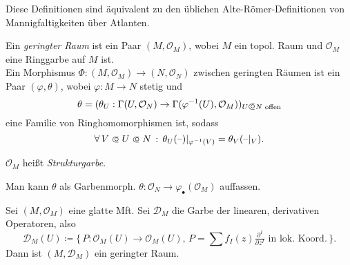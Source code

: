 \documentclass{cheat-sheet}
\renewcommand{\O}{\mathcal{O}} %
\begin{document}
\begin{bem}
  Diese Definitionen sind äquivalent zu den üblichen Alte-Römer-Definitionen von Mannigfaltigkeiten über Atlanten.
\end{bem}

\begin{defn}
  Ein \emph{geringter Raum} ist ein Paar $(M, \O_M)$, wobei $M$ ein topol. Raum und $\O_M$ eine Ringgarbe auf $M$ ist. \\
  Ein Morphismus $\Phi : (M, \O_M) \to (N, \O_N)$ zwischen geringten Räumen ist ein Paar $(\varphi, \theta)$, wobei $\varphi : M \to N$ stetig und
  \[ \theta = (\theta_U : \Gamma(U, \O_N) \to \Gamma(\varphi^{-1}(U), \O_M))_{U \opn N \text{ offen}} \]
  eine Familie von Ringhomomorphismen ist, sodass
  \[ \fa{V \opn U \opn N} \theta_U(\blank)|_{\varphi^{-1}(V)} = \theta_V(\blank|_V). \]
\end{defn}

\begin{sprech}
  $\O_M$ heißt \emph{Strukturgarbe}.
\end{sprech}


\begin{bem}
  Man kann $\theta$ als Garbenmorph. $\theta : \O_N \to \varphi_\bullet(\O_M)$ auffassen.
\end{bem}

\begin{bsp}
  Sei $(M, \O_M)$ eine glatte Mft. Sei $\mathcal{D}_M$ die Garbe der linearen, derivativen Operatoren, also
  \[ \mathcal{D}_M(U) \!\coloneqq\! \{ \, P \!:\! \O_M(U) \!\to\! \O_M(U), \, P \!=\! \sum f_I(z) \tfrac{\partial^I}{\partial z^I} \text{ in lok. Koord.} \, \}. \]
  Dann ist $(M, \mathcal{D}_M)$ ein geringter Raum. %
\end{bsp}


\end{document}
